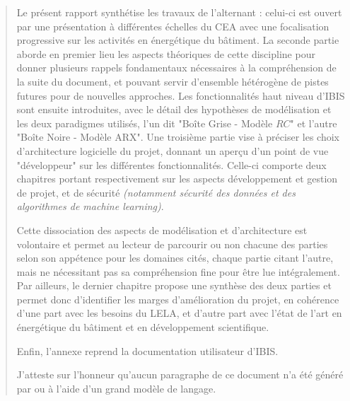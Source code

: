 \begin{abstract}
    Le présent rapport synthétise les travaux de l'alternant : celui-ci est ouvert par une présentation à différentes échelles du CEA avec une focalisation progressive sur les activités en énergétique du bâtiment.
    La seconde partie aborde en premier lieu les aspects théoriques de cette discipline pour donner plusieurs rappels fondamentaux nécessaires à la compréhension de la suite du document, et pouvant servir d'ensemble hétérogène de pistes futures pour de nouvelles approches.
    Les fonctionnalités haut niveau d'IBIS sont ensuite introduites, avec le détail des hypothèses de modélisation et les deux paradigmes utilisés, l'un dit "Boîte Grise - Modèle $RC$" et l'autre "Boîte Noire - Modèle ARX".
    Une troisième partie vise à préciser les choix d'architecture logicielle du projet, donnant un aperçu d'un point de vue "développeur" sur les différentes fonctionnalités.
    Celle-ci comporte deux chapitres portant respectivement sur les aspects développement et gestion de projet, et de sécurité \textit{(notamment sécurité des données et des algorithmes de machine learning)}.

    Cette dissociation des aspects de modélisation et d'architecture est volontaire et permet au lecteur de parcourir ou non chacune des parties selon son appétence pour les domaines cités, chaque partie
    citant l'autre, mais ne nécessitant pas sa compréhension fine pour être lue intégralement.
    Par ailleurs, le dernier chapitre propose une synthèse des deux parties et permet donc d'identifier les marges d'amélioration du projet, en cohérence d'une part avec les besoins du LELA, et d'autre part avec l'état de l'art en énergétique du bâtiment et en développement scientifique.

    Enfin, l'annexe reprend la documentation utilisateur d'IBIS\@.

    \begin{bluebox}
        J'atteste sur l'honneur qu'aucun paragraphe de ce document n'a été généré par ou à l'aide d'un grand modèle de langage.
    \end{bluebox}
\end{abstract}
